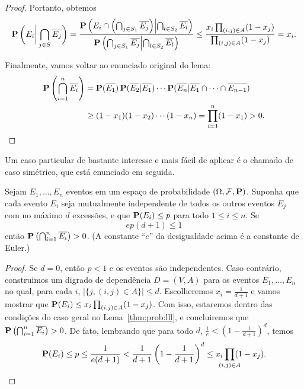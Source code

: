 \begin{proof}
Portanto, obtemos
\begin{align*}
  \operatorname{\mathbf{P}}\bigg( E_i \bigg| \bigcap_{j \in S} \overline{E_j} \bigg) = \frac{\operatorname{\mathbf{P}}\left( E_i \cap \left(\bigcap_{j \in S_1} \overline{E_j} \right) \middle| \bigcap_{l \in S_2} \overline{E_l} \right)}{\operatorname{\mathbf{P}}\left( \bigcap_{j \in S_1} \overline{E_j} \middle| \bigcap_{l \in S_2} \overline{E_l} \right)} \leq \frac{x_i\prod_{(i,j) \in A}(1-x_j)}{\prod_{(i,j) \in A}(1-x_j)} = x_i.
\end{align*}

Finalmente, vamos voltar ao enunciado original do lema:
\begin{align*}
\operatorname{\mathbf{P}} \left( \bigcap_{i = 1}^n \overline{E_i} \right) &= \operatorname{\mathbf{P}} (\overline{E_1}) \operatorname{\mathbf{P}} (\overline{E_2} | \overline{E_1} ) \cdots \operatorname{\mathbf{P}}( \overline{E_n} | \overline{E_1} \cap \dots \cap \overline{E_{n-1}}) \\
&\geq (1 - x_1)(1 - x_2)\cdots(1-x_n) = \prod_{i=1}^n(1 - x_1) > 0. \qedhere
\end{align*}
\end{proof}

Um caso particular de bastante interesse e mais fácil de aplicar é o chamado de caso simétrico, que está enunciado em seguida.

\begin{lemma}
\label{thm:prob:llls}
Sejam $E_1, \dots, E_n$ eventos em um espaço de probabilidade $(\Omega, \mathcal{F}, \operatorname{\mathbf{P}})$. Suponha que cada evento $E_i$ seja mutualmente independente de todos os outros eventos $E_j$ com no máximo $d$ excessões, e que $\operatorname{\mathbf{P}}(E_i) \leq p$ para todo $1 \leq i \leq n$. Se
\[ ep(d+1) \leq 1 \]
então $\operatorname{\mathbf{P}} \left( \bigcap_{i = 1}^n \overline{E_i} \right) > 0$. (A constante ``$e$'' da desigualdade acima é a constante de Euler.)
\end{lemma}
\begin{proof}
Se $d = 0$, então $p < 1$ e os eventos são independentes. Caso contrário, construimos um digrado de dependência $D = (V,A)$ para os eventos $E_1, \dots, E_n$ no qual, para cada $i$, $|\{j, (i,j) \in A\}| \leq d$. Escolheremos $x_i = \frac{1}{d+1}$ e vamos mostrar que $\operatorname{\mathbf{P}} (E_i) \leq x_i \prod_{(i,j) \in A}(1-x_j)$.
Com isso, estaremos dentro das condições do caso geral no Lema~\ref{thm:prob:lll}, e concluiremos que $\operatorname{\mathbf{P}} \left( \bigcap_{i = 1}^n \overline{E_i} \right) > 0$. De fato, lembrando que para todo $d$, $\frac{1}{e} < (1 - \frac{1}{d+1})^d$, temos
\[ \prob(E_i) \leq p \leq \frac{1}{e(d+1)} < \frac{1}{d+1}\left(1 - \frac{1}{d+1} \right)^d \leq x_i \prod_{\mathclap{(i,j) \in A}}(1-x_j). \qedhere\]
\end{proof}

